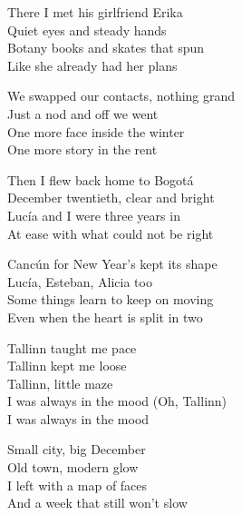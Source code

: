 \begin{lyrics}
There I met his girlfriend Erika\\
Quiet eyes and steady hands\\
Botany books and skates that spun\\
Like she already had her plans

We swapped our contacts, nothing grand\\
Just a nod and off we went\\
One more face inside the winter\\
One more story in the rent

Then I flew back home to Bogotá\\
December twentieth, clear and bright\\
Lucía and I were three years in\\
At ease with what could not be right

Cancún for New Year’s kept its shape\\
Lucía, Esteban, Alicia too\\
Some things learn to keep on moving\\
Even when the heart is split in two

Tallinn taught me pace\\
Tallinn kept me loose\\
Tallinn, little maze\\
I was always in the mood
(Oh, Tallinn)\\
I was always in the mood

Small city, big December\\
Old town, modern glow\\
I left with a map of faces\\
And a week that still won’t slow
\end{lyrics}

